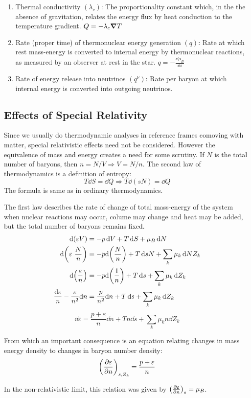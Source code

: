 \documentclass[12pt, letterpaper]{report}
\begin{document}
\begin{enumerate}
    \item Thermal conductivity $(\lambda_c)$: The proportionality constant which, in the the absence of gravitation, relates the energy flux by heat conduction to the temperature gradient. $Q= -\lambda_c\grad{T}$
    \item Rate (proper time) of thermonuclear energy generation $(q)$: Rate at which rest mass-energy is converted to internal energy by thermonuclear reactions, as measured by an observer at rest in the star. $q= -\frac{\dd \mu_B}{\dd s}$
    \item Rate of energy release into neutrinos $(q^\nu)$: Rate per baryon at which internal energy is converted into outgoing neutrinos.  
\end{enumerate}

\subsection{Effects of Special Relativity}

Since we usually do thermodynamic analyses in reference frames comoving with matter, special relativistic effects need not be considered. However the equivalence of mass and energy creates a need for some scrutiny. If $N$ is the total number of baryons, then $n= N/V\Rightarrow V= N/n$. The second law of thermodynamics is a definition of entropy:
$$T\dd S= \dd{Q}\Rightarrow T\dd(sN)= \dd Q$$
The formula is same as in ordinary thermodynamics.

The first law describes the rate of change of total mass-energy of the system when nuclear reactions may occur, colume may change and heat may be added, but the total number of baryons remains fixed. 
\begin{align*}
    \dd\qty({\varepsilon V})&= -p\dd{V}+T\dd{S}+ \mu_B \dd{N}\\
    \dd\qty({\varepsilon\  \frac{N}{n}})&= -p\dd\qty(\frac{N}{n})+T\dd{sN}+ \sum_k\mu_k \dd{NZ_k}\\
    \dd\qty({\frac{\varepsilon}{n}})&= -p\dd\qty(\frac{1}{n})+T\dd{s}+ \sum_k\mu_k \dd{Z_k}\\
    \frac{\dd{\varepsilon}}{n}- \frac{\varepsilon}{n^2}\dd n&= \frac{p}{n^2}\dd n+T\dd{s}+ \sum_k\mu_k \dd{Z_k}
\end{align*}
\begin{equation}
    \dd{\varepsilon}= \frac{p+\varepsilon}{n}\dd n+Tn\dd{s}+ \sum_k\mu_k n \dd{Z_k} \label{eq3.1}
\end{equation}

From which an important consequence is an equation relating changes in mass energy density to changes in baryon number density: 
\begin{equation}
    \qty(\pdv{\varepsilon}{n})_{s,Z_k}= \frac{p+\varepsilon}{n} \label{de/dn}
\end{equation}

In the non-relativistic limit, this relation was given by $\qty(\pdv{\varepsilon}{n})_{s}= \mu_B$.
\end{document}
